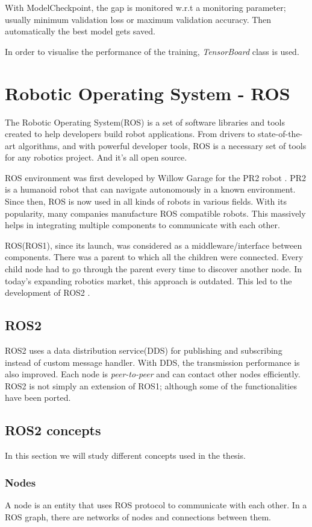 With ModelCheckpoint, the gap is monitored w.r.t a monitoring parameter; usually minimum validation
loss or maximum validation accuracy. Then automatically the best model gets saved.

In order to visualise the performance of the training, \textit{TensorBoard} class is used.

\section{Robotic Operating System - ROS}
The Robotic Operating System(ROS) \cite{aboutros} is a set of software libraries and tools created to help
developers build robot applications. From drivers to state-of-the-art algorithms, and with powerful developer tools, ROS is a necessary set of tools for any robotics project. And it’s all open source.

ROS environment was first developed by Willow Garage for the PR2 robot \cite{firstros}. PR2 is a humanoid robot that can navigate autonomously in a known environment.
Since then, ROS is now used in all kinds of robots in various fields. With its popularity,
many companies manufacture ROS compatible robots. This massively helps in integrating
multiple components to communicate with each other.

ROS(ROS1), since its launch, was considered as a middleware/interface between components. There was a
parent to which all the children were connected. Every child node had to go through the
parent every time to discover another node.  In today's expanding robotics market,
this approach is outdated. This led to the development of ROS2 \cite{whyros2}.
\subsection{ROS2}
ROS2 uses a data distribution service(DDS) for publishing and subscribing instead of
custom message handler. With DDS, the transmission performance is also improved. Each node
is \textit{peer-to-peer} and can contact other nodes efficiently.
ROS2 is not simply an extension of ROS1; although some of the functionalities have been
ported.


\subsection{ROS2 concepts}
In this section we will study different concepts used in the thesis.
\subsubsection*{Nodes}
A node is an entity that uses ROS protocol to communicate with each other. In a ROS graph,
there are networks of nodes and connections between them.
